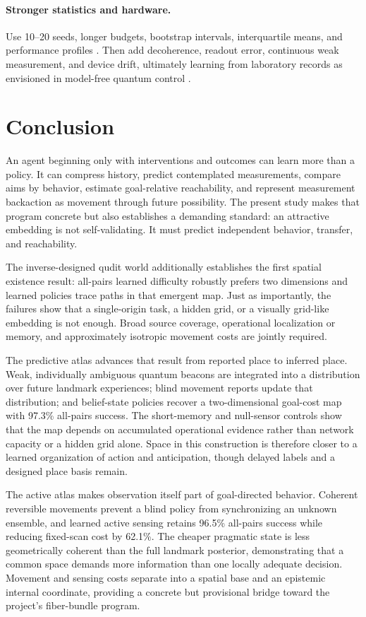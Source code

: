 \documentclass[11pt]{article}
\begin{document}
\paragraph{Stronger statistics and hardware.}
Use 10--20 seeds, longer budgets, bootstrap intervals, interquartile means, and
performance profiles \cite{henderson2018,agarwal2021}. Then add decoherence,
readout error, continuous weak measurement, and device drift, ultimately
learning from laboratory records as envisioned in model-free quantum control
\cite{sivak2022}.

\section{Conclusion}

An agent beginning only with interventions and outcomes can learn more than a
policy. It can compress history, predict contemplated measurements, compare
aims by behavior, estimate goal-relative reachability, and represent
measurement backaction as movement through future possibility. The present
study makes that program concrete but also establishes a demanding standard:
an attractive embedding is not self-validating. It must predict independent
behavior, transfer, and reachability.

The inverse-designed qudit world additionally establishes the first spatial
existence result: all-pairs learned difficulty robustly prefers two dimensions
and learned policies trace paths in that emergent map. Just as importantly,
the failures show that a single-origin task, a hidden grid, or a visually
grid-like embedding is not enough. Broad source coverage, operational
localization or memory, and approximately isotropic movement costs are jointly
required.

The predictive atlas advances that result from reported place to inferred
place. Weak, individually ambiguous quantum beacons are integrated into a
distribution over future landmark experiences; blind movement reports update
that distribution; and belief-state policies recover a two-dimensional
goal-cost map with 97.3\% all-pairs success. The short-memory and null-sensor
controls show that the map depends on accumulated operational evidence rather
than network capacity or a hidden grid alone. Space in this construction is
therefore closer to a learned organization of action and anticipation, though
delayed labels and a designed place basis remain.

The active atlas makes observation itself part of goal-directed behavior.
Coherent reversible movements prevent a blind policy from synchronizing an
unknown ensemble, and learned active sensing retains 96.5\% all-pairs success
while reducing fixed-scan cost by 62.1\%. The cheaper pragmatic state is less
geometrically coherent than the full landmark posterior, demonstrating that a
common space demands more information than one locally adequate decision.
Movement and sensing costs separate into a spatial base and an epistemic
internal coordinate, providing a concrete but provisional bridge toward the
project's fiber-bundle program.
\end{document}
